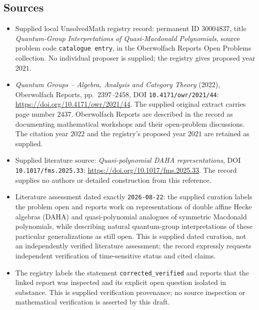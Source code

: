 \documentclass[11pt]{article}
\begin{document}
\subsection{Sources}
\begin{itemize}
\item Supplied local UnsolvedMath registry record: permanent ID \(30004837\), title \emph{Quantum-Group Interpretations of Quasi-Macdonald Polynomials}, source problem code \texttt{catalogue entry}, in the Oberwolfach Reports Open Problems collection. No individual proposer is supplied; the registry gives proposed year \(2021\).
\item \emph{Quantum Groups -- Algebra, Analysis and Category Theory} (2022), Oberwolfach Reports, pp.\ 2397--2458, DOI \texttt{10.4171/owr/2021/44}: \url{https://doi.org/10.4171/owr/2021/44}. The supplied original extract carries page number \(2437\). Oberwolfach Reports are described in the record as documenting mathematical workshops and their open-problem discussions. The citation year \(2022\) and the registry's proposed year \(2021\) are retained as supplied.
\item Supplied literature source: \emph{Quasi-polynomial DAHA representations}, DOI \texttt{10.1017/fms.2025.33}: \url{https://doi.org/10.1017/fms.2025.33}. The record supplies no authors or detailed construction from this reference.
\item Literature assessment dated exactly \texttt{2026-08-22}: the supplied curation labels the problem open and reports work on representations of double affine Hecke algebras (DAHA) and quasi-polynomial analogues of symmetric Macdonald polynomials, while describing natural quantum-group interpretations of these particular generalizations as still open. This is supplied dated curation, not an independently verified literature assessment; the record expressly requests independent verification of time-sensitive status and cited claims.
\item The registry labels the statement \texttt{corrected\_verified} and reports that the linked report was inspected and its explicit open question isolated in substance. This is supplied verification provenance; no source inspection or mathematical verification is asserted by this draft.
\end{itemize}
\end{document}
